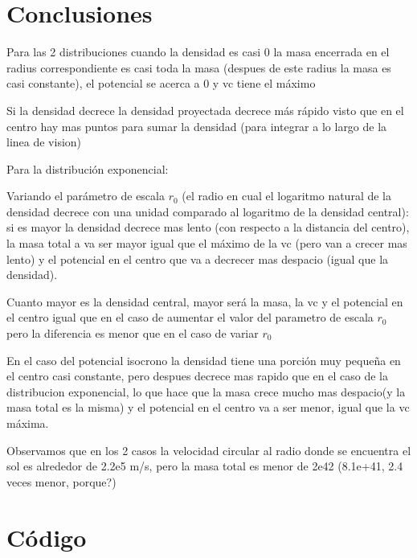 \documentclass[12pt]{book}
\begin{document}
\section*{Conclusiones}
\begin{description}
\item Para las 2 distribuciones cuando la densidad es casi 0 la masa encerrada en el radius correspondiente es casi toda la masa (despues de este radius la masa es casi constante), el potencial se acerca a 0 y vc tiene el máximo
\item Si la densidad decrece la densidad proyectada decrece más rápido visto que en el centro hay mas puntos para sumar la densidad (para integrar a lo largo de la linea de vision)

\item Para la distribución exponencial:

\begin{description}
	\item Variando el parámetro de escala $r_0$ (el radio en cual el logaritmo natural de la densidad decrece con una unidad comparado al logaritmo de la densidad central): si es mayor la densidad decrece mas lento (con respecto a la distancia del centro), la masa total  a va ser mayor igual que el máximo de la vc (pero van a crecer mas lento) y el potencial en el centro que va a decrecer mas despacio (igual que la densidad).	
\item Cuanto mayor es la densidad central, mayor será la masa, la vc  y el potencial en el centro igual que en el caso de aumentar el valor del parametro de escala $r_0$ pero la diferencia es menor que en el caso de variar $r_0$
\end{description}

\item En el caso del potencial isocrono la densidad tiene una porción muy pequeña en el centro casi constante, pero despues decrece mas rapido que en el caso de la distribucion exponencial, lo que hace que la masa crece mucho mas despacio(y la masa total es la misma)  y el potencial en el centro va a ser menor, igual que la vc máxima.
\item Observamos que en los 2 casos la  velocidad circular al radio donde se encuentra el sol es alrededor de 2.2e5 m/s, pero la masa total es menor de 2e42 (8.1e+41, 2.4 veces menor, porque?)
\end{description}


\clearpage

\section*{Código}
\end{document}
